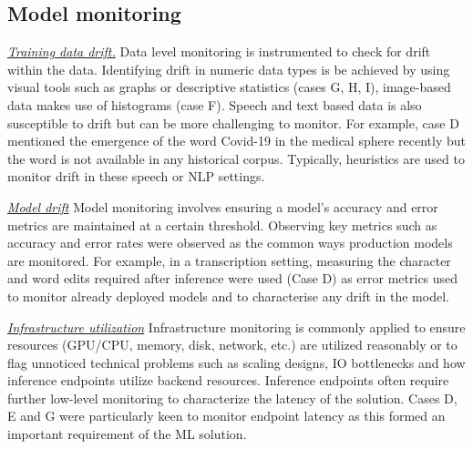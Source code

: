 \subsection{Model monitoring} 

\underline{\emph{Training data drift.}} Data level monitoring is instrumented to check for drift within the data. Identifying drift in numeric data types is be achieved by using visual tools such as graphs or descriptive statistics (cases G, H, I), image-based data makes use of histograms (case F). Speech and text based data is also susceptible to drift but can be more challenging to monitor. For example, case D mentioned the emergence of the word Covid-19 in the medical sphere recently but the word is not available in any historical corpus. Typically, heuristics are used to monitor drift in these speech or NLP settings.

\underline{\emph{Model drift}} Model monitoring involves ensuring a model's accuracy and error metrics are maintained at a certain threshold. Observing key metrics such as accuracy and error rates were observed as the common ways production models are monitored. For example, in a transcription setting, measuring the character and word edits required after inference were used (Case D) as error metrics used to monitor already deployed models and to characterise any drift in the model.

\underline{\emph{Infrastructure utilization}} Infrastructure monitoring is commonly applied to ensure resources (GPU/CPU, memory, disk, network, etc.) are utilized reasonably or to flag unnoticed technical problems such as scaling designs, IO bottlenecks and how inference endpoints utilize backend resources. Inference endpoints often require further low-level monitoring to characterize the latency of the solution. Cases D, E and G were particularly keen to monitor endpoint latency as this formed an important requirement of the ML solution.


